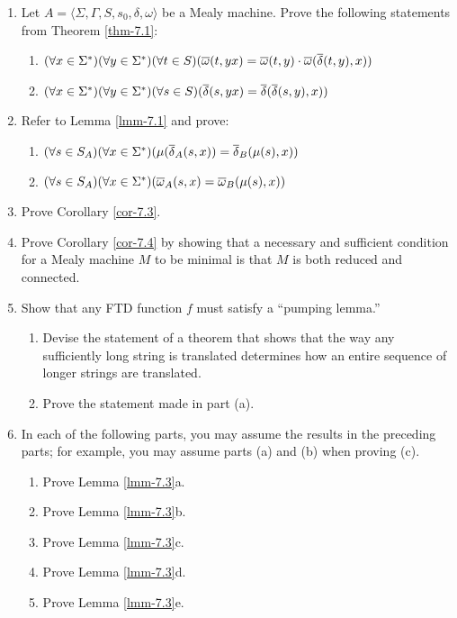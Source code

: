 \begin{enumerate}[{7.}1.]
\item Let $A=\langle\Sigma,\Gamma,S,s_0,\delta,\omega\rangle$ be a Mealy
machine. Prove the following statements from Theorem \ref{thm-7.1}:
\begin{enumerate}
\item $(\forall x \in \Sigma^*)(\forall y \in \Sigma^*)(\forall t \in S)
	(\overline{\omega}(t,yx) = \overline{\omega}(t,y) \cdot \overline{\omega}(\overline{\delta}(t,y),x))$
\item $(\forall x \in \Sigma^*)(\forall y \in \Sigma^*)(\forall s \in S)
	(\overline{\delta}(s,yx) = \overline{\delta}(\overline{\delta}(s,y),x))$
\end{enumerate}

\item Refer to Lemma \ref{lmm-7.1} and prove:
\begin{enumerate}
\item $(\forall s \in S_A)(\forall x \in \Sigma^*)(\mu(\overline{\delta}_A(s,x)) =
	\overline{\delta}_B(\mu(s),x))$
\item $(\forall s \in S_A)(\forall x \in \Sigma^*)(\overline{\omega}_A(s,x) =
	\overline{\omega}_B(\mu(s),x))$
\end{enumerate}

\item Prove Corollary \ref{cor-7.3}.

\item Prove Corollary \ref{cor-7.4} by showing that a necessary and sufficient condition
for a Mealy machine $M$ to be minimal is that $M$ is both reduced and connected.

\item Show that any FTD function $f$ must satisfy a ``pumping lemma.''
\begin{enumerate}
\item Devise the statement of a theorem that shows that the way any sufficiently
long string is translated determines how an entire sequence of longer strings
are translated.
\item Prove the statement made in part (a).
\end{enumerate}

\item In each of the following parts, you may assume the results in the
preceding parts; for example, you may assume parts (a) and (b) when proving (c).
\begin{enumerate}
\item Prove Lemma \ref{lmm-7.3}a.
\item Prove Lemma \ref{lmm-7.3}b.
\item Prove Lemma \ref{lmm-7.3}c.
\item Prove Lemma \ref{lmm-7.3}d.
\item Prove Lemma \ref{lmm-7.3}e.
\end{enumerate}


\end{enumerate}
